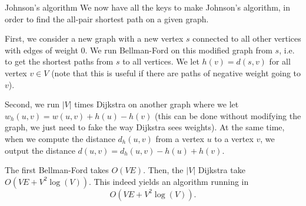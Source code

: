 \documentclass[a4paper]{article}
\begin{document}
\begin{parag}{Johnson's algorithm}
    We now have all the keys to make Johnson's algorithm, in order to find the all-pair shortest path on a given graph.

    First, we consider a new graph with a new vertex $s$ connected to all other vertices with edges of weight 0. We run Bellman-Ford on this modified graph from $s$, i.e. to get the shortest paths from $s$ to all vertices. We let $h\left(v\right) = d\left(s, v\right)$ for all vertex $v \in V$ (note that this is useful if there are paths of negative weight going to $v$).

    Second, we run $\left|V\right|$ times Dijkstra on another graph where we let $w_h\left(u, v\right) = w\left(u, v\right) + h\left(u\right) - h\left(v\right)$ (this can be done without modifying the graph, we just need to fake the way Dijkstra sees weights). At the same time, when we compute the distance $d_h\left(u, v\right)$ from a vertex $u$ to a vertex $v$, we output the distance $d\left(u, v\right) = d_h\left(u, v\right) - h\left(u\right) + h\left(v\right)$.

    The first Bellman-Ford takes $O\left(VE\right)$. Then, the $\left|V\right|$ Dijkstra take $O\left(VE + V^2 \log\left(V\right)\right)$. This indeed yields an algorithm running in
    \[O\left(VE + V^2 \log\left(V\right)\right).\]
\end{parag}
\end{document}

